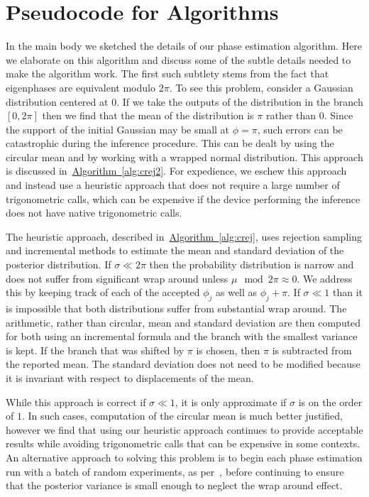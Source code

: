 \documentclass[aps,pra,amsmath,twocolumn,amssymb,superscriptaddress]{revtex4-1}
\newcommand{\alg}[1]{\hyperref[alg:#1]{Algorithm~\ref*{alg:#1}}}
\begin{document}
\section{Pseudocode for Algorithms}
\label{app:pseudocode}

In the main body we sketched the details of our phase estimation algorithm.  Here we elaborate on this algorithm and discuss some of the
subtle details needed to make the algorithm work.  The first such subtlety stems from the fact that eigenphases are equivalent modulo $2\pi$.  
To see this problem, consider a Gaussian distribution centered at $0$.  If we take the outputs of the distribution in the branch $[0,2\pi]$ then we find that the mean of the distribution is $\pi$ rather than $0$.  Since the support of the initial Gaussian may be small at $\phi=\pi$, such errors can be catastrophic during the inference procedure.  This can be dealt by using the circular mean and by working with a wrapped normal distribution.  This approach is discussed in~\alg{crej2}.  For expedience, we eschew this approach and instead use a heuristic approach that does  not require a large number of trigonometric calls, which can be expensive if the device performing the inference does not have native trigonometric calls.

The heuristic approach, described in~\alg{crej}, uses rejection sampling and incremental methods to estimate the mean and standard deviation of the posterior distribution.  If $\sigma\ll 2\pi$ then the probability distribution is narrow and does not suffer from significant wrap around unless $\mu \mod 2\pi \approx 0$.  We address this by keeping track of each of the accepted $\phi_j$ as well as $\phi_j+\pi$.  If $\sigma\ll 1$ than it is impossible that both distributions suffer from substantial wrap around.  The arithmetic, rather than circular, mean and standard deviation are then computed for both using an incremental formula and the branch with the smallest variance is kept.  If the branch that was shifted by $\pi$ is chosen, then $\pi$ is subtracted from the reported mean.  The standard deviation does not need to be modified because it is invariant with respect to displacements of the mean.

While this approach is correct if $\sigma\ll 1$, it is only approximate if $\sigma$ is on the order of $1$.  In such cases, computation of the circular mean is much better justified, however we find that using our heuristic approach continues to provide acceptable results while avoiding trigonometric calls that can be expensive in some contexts.  An alternative approach to solving this problem is to begin each phase estimation run with a batch of random experiments, as per~\cite{SHF14}, before continuing to ensure that the posterior variance is small enough to neglect the wrap around effect.
\end{document}
